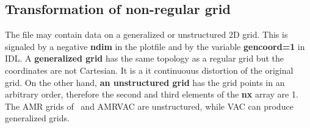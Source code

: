 \subsection{Transformation of non-regular grid \label{s-transform}}

   The file may contain data on a generalized or unstructured 2D grid.
   This is signaled by a negative {\bf ndim} in the plotfile 
   and by the variable {\bf gencoord=1} in IDL.
   A {\bf generalized grid} has the same topology as a regular grid
   but the coordinates are not Cartesian. It is a {it continuouus}
   distortion of the original grid. On the other hand, 
   {\bf an unstructured grid} has the grid points in an arbitrary
   order, therefore the second and third elements of the 
   {\bf nx} array are 1. The AMR grids of \BATSRUS\ and AMRVAC are
   unstructured, while VAC can produce generalized grids.

